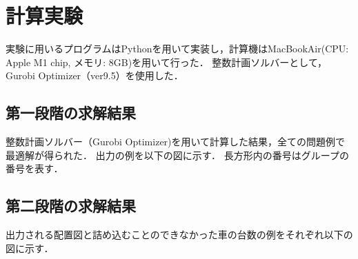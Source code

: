 \chapter{計算実験}\label{computational_result}
実験に用いるプログラムはPythonを用いて実装し，計算機はMacBookAir(CPU: Apple M1 chip, メモリ: 8GB)を用いて行った．
整数計画ソルバーとして，Gurobi Optimizer（ver9.5）を使用した．

\section{第一段階の求解結果}
整数計画ソルバー（Gurobi Optimizer)を用いて計算した結果，全ての問題例で最適解が得られた．
出力の例を以下の図に示す．
長方形内の番号はグループの番号を表す．

\section{第二段階の求解結果}
出力される配置図と詰め込むことのできなかった車の台数の例をそれぞれ以下の図に示す．

